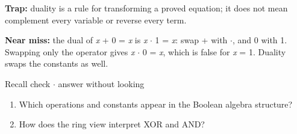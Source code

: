 \documentclass[11pt]{article}
\begin{document}
\begin{keepsection}
\begin{keepsection}
\begin{notebox}\textbf{Trap:} duality is a rule for transforming a proved equation; it does not mean complement every variable or reverse every term.\end{notebox}

\begin{notebox}\textbf{Near miss:} the dual of \textit{x} + 0 = \textit{x} is \textit{x} \ensuremath{\cdot} 1 = \textit{x}: swap + with \ensuremath{\cdot}, and 0 with 1. Swapping only the operator gives \textit{x} \ensuremath{\cdot} 0 = \textit{x}, which is false for \textit{x} = 1. Duality swaps the constants as well.\end{notebox}

\begin{recallbox}{Recall check \ensuremath{\cdot} answer without looking}
\begin{enumerate}
\item Which operations and constants appear in the Boolean algebra structure?
\item How does the ring view interpret XOR and AND?
\end{enumerate}

\end{recallbox}
\end{keepsection}
\end{keepsection}
\end{document}
